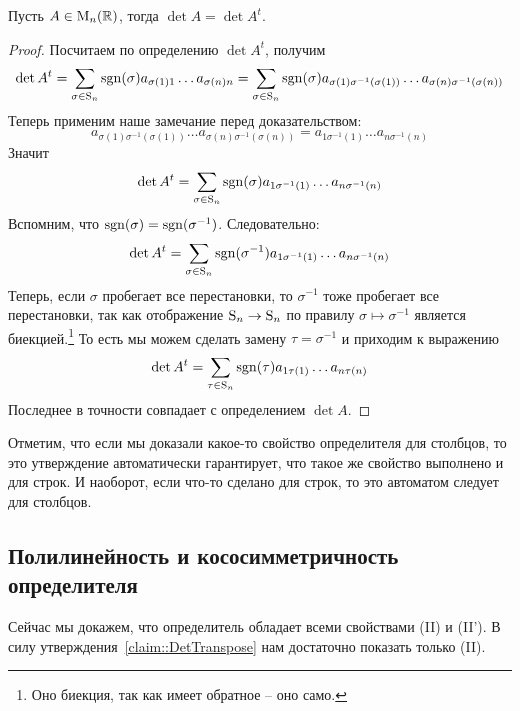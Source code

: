 \begin{claim}\label{claim::DetTranspose}
Пусть $A\in \operatorname{M}_{n}(\mathbb R)$, тогда $\det A = \det A^t$.
\end{claim}
\begin{proof}
Посчитаем по определению $\det A^t$, получим
\[
\det A^t = \sum_{\sigma\in\operatorname{S}_{n}}\operatorname{sgn}(\sigma)a_{\sigma(1)1} \ldots a_{\sigma(n)n} = 
\sum_{\sigma\in\operatorname{S}_{n}}\operatorname{sgn}(\sigma)a_{\sigma(1)\sigma^{-1}(\sigma(1))} \ldots a_{\sigma(n)\sigma^{-1}(\sigma(n))}
\]
Теперь применим наше замечание перед доказательством:
\[
a_{\sigma(1)\sigma^{-1}(\sigma(1))} \ldots a_{\sigma(n)\sigma^{-1}(\sigma(n))}
=
a_{1 \sigma^{-1}(1)}\ldots a_{n\sigma^{-1}(n)}
\]
Значит
\[
\det A^t = \sum_{\sigma\in\operatorname{S}_{n}}\operatorname{sgn}(\sigma) a_{1 \sigma^{-1}(1)}\ldots a_{n\sigma^{-1}(n)}
\]
Вспомним, что $\operatorname{sgn}(\sigma) = \operatorname{sgn}(\sigma^{-1})$. Следовательно:
\[
\det A^t = \sum_{\sigma\in\operatorname{S}_{n}}\operatorname{sgn}(\sigma^{-1}) a_{1 \sigma^{-1}(1)}\ldots a_{n\sigma^{-1}(n)}
\]
Теперь, если $\sigma$ пробегает все перестановки, то $\sigma^{-1}$ тоже пробегает все перестановки, так как отображение $\operatorname{S}_{n}\to \operatorname{S}_{n}$ по правилу $\sigma\mapsto \sigma^{-1}$ является биекцией.\footnote{Оно биекция, так как имеет обратное -- оно само.} То есть мы можем сделать замену $\tau = \sigma^{-1}$ и приходим к выражению
\[
\det A^t = \sum_{\tau\in\operatorname{S}_{n}}\operatorname{sgn}(\tau)a_{1\tau(1)}\ldots a_{n\tau(n)}
\]
Последнее в точности совпадает с определением $\det A$.
\end{proof}

Отметим, что если мы доказали какое-то свойство определителя для столбцов, то это утверждение автоматически гарантирует, что такое же свойство выполнено и для строк. И наоборот, если что-то сделано для строк, то это автоматом следует для столбцов.

\subsection{Полилинейность и кососимметричность определителя}

Сейчас мы докажем, что определитель обладает всеми свойствами (II) и (II'). В силу утверждения~\ref{claim::DetTranspose} нам достаточно показать только (II).

